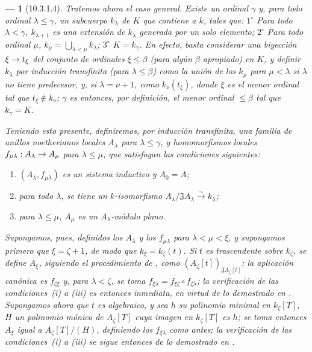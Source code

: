 \documentclass[10pt,oneside,openany]{book}
\theoremstyle{egaenv}\newtheorem*{env}{---}
\theoremstyle{egastatement}
\theoremstyle{egadescription}
\renewcommand{\leq}{\leqslant}
\renewcommand{\to}{\mathchoice{\longrightarrow}{\rightarrow}{\rightarrow}{\rightarrow}}
\begin{document}
\begin{env}[10.3.1.4]
\label{0.10.3.1.4}
\label{0.10.3.1.4-fr}
Tratemos ahora el caso general.
Existe un ordinal $\gamma$ y, para todo ordinal $\lambda\leq\gamma$, un subcuerpo $k_\lambda$ de $K$ que contiene a $k$, tales que: $1^\circ$ Para todo $\lambda<\gamma$,
$k_{\lambda+1}$ es una extensión de $k_\lambda$ generada por un solo elemento; $2^\circ$ Para todo ordinal $\mu$, $k_\mu=\bigcup_{\lambda<\mu}k_\lambda$;
$3^\circ$ $K=k_\gamma$.
En efecto, basta considerar una biyección $\xi\to t_\xi$ del conjunto de ordinales $\xi\leq\beta$ (para algún $\beta$ apropiado) en $K$, y definir $k_\lambda$ por inducción transfinita (para $\lambda\leq\beta$) como la unión de los $k_\mu$ para $\mu<\lambda$ si $\lambda$ no tiene predecesor, y, si $\lambda=\nu+1$, como $k_\nu(t_\xi)$, donde $\xi$ es el menor ordinal tal que $t_\xi\notin k_\nu$;
$\gamma$ es entonces, por definición, el menor ordinal $\leq\beta$ tal que $k_\gamma=K$.

Teniendo esto presente, definiremos, por inducción transfinita, una familia de anillos noetherianos locales $A_\lambda$ para $\lambda\leq\gamma$, y homomorfismos locales $f_{\mu\lambda}:A_\lambda\to A_\mu$ para $\lambda\leq\mu$, que satisfagan las condiciones siguientes:
\begin{enumerate}
  \item[(i)] $(A_\lambda,f_{\mu\lambda})$ es un sistema inductivo y $A_0=A$;
  \item[(ii)] para todo $\lambda$, se tiene un $k$-isomorfismo $A_\lambda/\mathfrak J A_\lambda\xrightarrow{\sim}k_\lambda$;
  \item[(iii)] para $\lambda\leq\mu$,
$A_\mu$ es un $A_\lambda$-módulo plano.
\end{enumerate}

Supongamos, pues, definidos los $A_\lambda$ y los $f_{\mu\lambda}$ para $\lambda<\mu<\xi$, y supongamos primero que $\xi=\zeta+1$, de modo que $k_\xi=k_\zeta(t)$.
Si $t$ es trascendente sobre $k_\zeta$, se define $A_\xi$, siguiendo el procedimiento de , como $(A_\zeta[t])_{\mathfrak J A_\zeta[t]}$;
la aplicación canónica es $f_{\zeta\xi}$ y, para $\lambda<\zeta$, se toma $f_{\xi\lambda}=f_{\xi\zeta}\circ f_{\zeta\lambda}$;
la verificación de las condiciones~(i) a (iii) es entonces inmediata, en virtud de lo demostrado en .
Supongamos ahora que $t$ es algebraico, y sea $h$ su polinomio minimal en $k_\zeta[T]$,
$H$ un polinomio mónico de $A_\zeta[T]$ cuya imagen en $k_\zeta[T]$ es $h$;
se toma entonces $A_\xi$ igual a $A_\zeta[T]/(H)$, definiendo los $f_{\xi\lambda}$ como antes;
la verificación de las condiciones~(i) a (iii) se sigue entonces de lo demostrado en .


\end{env}
\end{document}
